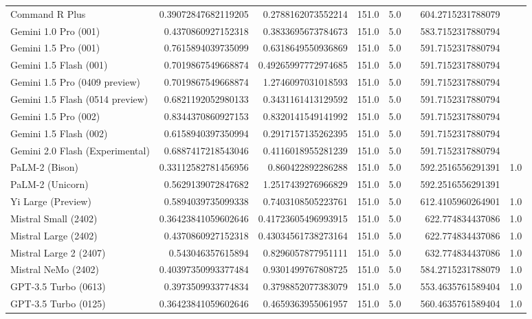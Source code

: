 \begin{table}[htp]
{\begin{tabular}{lrrrrrrr}
Command R Plus & 0.39072847682119205 & 0.2788162073552214 & 151.0 & 5.0 &  & 604.2715231788079 &  \\
Gemini 1.0 Pro (001) & 0.4370860927152318 & 0.3833695673784673 & 151.0 & 5.0 &  & 583.7152317880794 &  \\
Gemini 1.5 Pro (001) & 0.7615894039735099 & 0.6318649550936869 & 151.0 & 5.0 &  & 591.7152317880794 &  \\
Gemini 1.5 Flash (001) & 0.7019867549668874 & 0.49265997772974685 & 151.0 & 5.0 &  & 591.7152317880794 &  \\
Gemini 1.5 Pro (0409 preview) & 0.7019867549668874 & 1.2746097031018593 & 151.0 & 5.0 &  & 591.7152317880794 &  \\
Gemini 1.5 Flash (0514 preview) & 0.6821192052980133 & 0.3431161413129592 & 151.0 & 5.0 &  & 591.7152317880794 &  \\
Gemini 1.5 Pro (002) & 0.8344370860927153 & 0.8320141549141992 & 151.0 & 5.0 &  & 591.7152317880794 &  \\
Gemini 1.5 Flash (002) & 0.6158940397350994 & 0.2917157135262395 & 151.0 & 5.0 &  & 591.7152317880794 &  \\
Gemini 2.0 Flash (Experimental) & 0.6887417218543046 & 0.4116018955281239 & 151.0 & 5.0 &  & 591.7152317880794 &  \\
PaLM-2 (Bison) & 0.33112582781456956 & 0.860422892286288 & 151.0 & 5.0 &  & 592.2516556291391 & 1.0 \\
PaLM-2 (Unicorn) & 0.5629139072847682 & 1.2517439276966829 & 151.0 & 5.0 &  & 592.2516556291391 &  \\
Yi Large (Preview) & 0.5894039735099338 & 0.7403108505223761 & 151.0 & 5.0 &  & 612.4105960264901 & 1.0 \\
Mistral Small (2402) & 0.36423841059602646 & 0.41723605496993915 & 151.0 & 5.0 &  & 622.774834437086 & 1.0 \\
Mistral Large (2402) & 0.4370860927152318 & 0.43034561738273164 & 151.0 & 5.0 &  & 622.774834437086 & 1.0 \\
Mistral Large 2 (2407) & 0.543046357615894 & 0.8296057877951111 & 151.0 & 5.0 &  & 632.774834437086 & 1.0 \\
Mistral NeMo (2402) & 0.40397350993377484 & 0.9301499767808725 & 151.0 & 5.0 &  & 584.2715231788079 & 1.0 \\
GPT-3.5 Turbo (0613) & 0.3973509933774834 & 0.3798852077383079 & 151.0 & 5.0 &  & 553.4635761589404 & 1.0 \\
GPT-3.5 Turbo (0125) & 0.36423841059602646 & 0.4659363955061957 & 151.0 & 5.0 &  & 560.4635761589404 & 1.0 \\

\end{tabular}}
\end{table}
